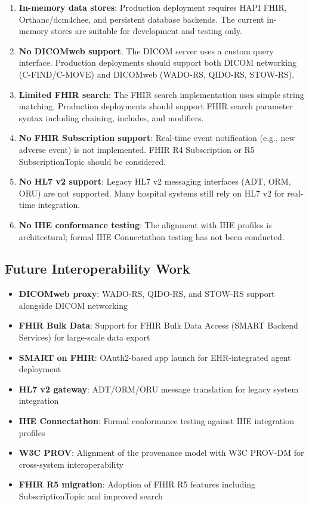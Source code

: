 \documentclass[10pt,letterpaper]{article}
\begin{document}
\begin{enumerate}[leftmargin=2em]
    \item \textbf{In-memory data stores}: Production deployment requires HAPI FHIR, Orthanc/dcm4chee, and persistent database backends. The current in-memory stores are suitable for development and testing only.

    \item \textbf{No DICOMweb support}: The DICOM server uses a custom query interface. Production deployments should support both DICOM networking (C-FIND/C-MOVE) and DICOMweb (WADO-RS, QIDO-RS, STOW-RS).

    \item \textbf{Limited FHIR search}: The FHIR search implementation uses simple string matching. Production deployments should support FHIR search parameter syntax including chaining, includes, and modifiers.

    \item \textbf{No FHIR Subscription support}: Real-time event notification (e.g., new adverse event) is not implemented. FHIR R4 Subscription or R5 SubscriptionTopic should be considered.

    \item \textbf{No HL7 v2 support}: Legacy HL7 v2 messaging interfaces (ADT, ORM, ORU) are not supported. Many hospital systems still rely on HL7 v2 for real-time integration.

    \item \textbf{No IHE conformance testing}: The alignment with IHE profiles is architectural; formal IHE Connectathon testing has not been conducted.
\end{enumerate}

\subsection{Future Interoperability Work}

\begin{itemize}[leftmargin=2em]
    \item \textbf{DICOMweb proxy}: WADO-RS, QIDO-RS, and STOW-RS support alongside DICOM networking
    \item \textbf{FHIR Bulk Data}: Support for FHIR Bulk Data Access (SMART Backend Services) for large-scale data export
    \item \textbf{SMART on FHIR}: OAuth2-based app launch for EHR-integrated agent deployment
    \item \textbf{HL7 v2 gateway}: ADT/ORM/ORU message translation for legacy system integration
    \item \textbf{IHE Connectathon}: Formal conformance testing against IHE integration profiles
    \item \textbf{W3C PROV}: Alignment of the provenance model with W3C PROV-DM for cross-system interoperability
    \item \textbf{FHIR R5 migration}: Adoption of FHIR R5 features including SubscriptionTopic and improved search
\end{itemize}
\end{document}
